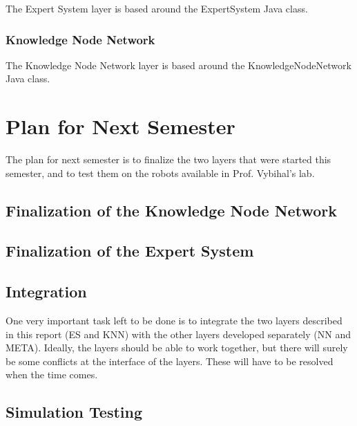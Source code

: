 \documentclass[titlepage,11pt]{article}
\begin{document}
The Expert System layer is based around the ExpertSystem Java class.

\subsubsection{Knowledge Node Network}

The Knowledge Node Network layer is based around the KnowledgeNodeNetwork Java class.

\section{Plan for Next Semester}

The plan for next semester is to finalize the two layers that were started this semester, and to test them on the robots available in Prof. Vybihal's lab.

\subsection{Finalization of the Knowledge Node Network}

\subsection{Finalization of the Expert System}

\subsection{Integration}

One very important task left to be done is to integrate the two layers described in this report (ES and KNN) with the other layers developed separately (NN and META). Ideally, the layers should be able to work together, but there will surely be some conflicts at the interface of the layers. These will have to be resolved when the time comes.

\subsection{Simulation Testing}
\end{document}
